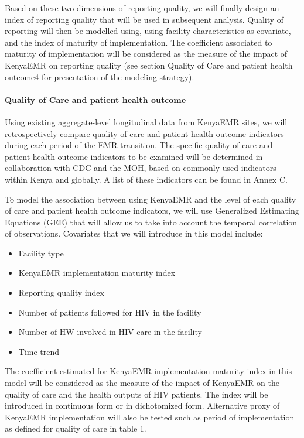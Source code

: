 \documentclass[a4paper,11pt,final,twoside]{article}
\begin{document}
Based on these two dimensions of reporting quality, we will finally design an index of reporting quality that will be used in subsequent analysis. Quality of reporting will then be modelled using, using facility characteristics as covariate, and the index of maturity of implementation. The coefficient associated to maturity of implementation will be considered as the measure of the impact of KenyaEMR on reporting quality (see section Quality of Care and patient health outcome4 for presentation of the modeling strategy).

\paragraph{Quality of Care and patient health outcome}

Using existing aggregate-level longitudinal data from KenyaEMR sites, we will retrospectively compare quality of care and patient health outcome indicators during each period of the EMR transition. The specific quality of care and patient health outcome indicators to be examined will be determined in collaboration with CDC and the MOH, based on commonly-used indicators within Kenya and globally. A list of these indicators can be found in Annex C.

To model the association between using KenyaEMR and the level of each quality of care and patient health outcome indicators, we will use Generalized Estimating Equations (GEE) that will allow us to take into account the temporal correlation of observations. Covariates that we will introduce in this model include:
\begin{itemize}
\item	Facility type
\item	KenyaEMR implementation maturity index
\item	Reporting quality index
\item	Number of patients followed for HIV in the facility
\item	Number of HW involved in HIV care in the facility
\item	Time trend
\end{itemize}
The coefficient estimated for KenyaEMR implementation maturity index in this model will be considered as the measure of the impact of KenyaEMR on the quality of care and the health outputs of HIV patients. The index will be introduced in continuous form or in dichotomized form. Alternative proxy of KenyaEMR implementation will also be tested such as period of implementation as defined for quality of care in table 1.
\end{document}
